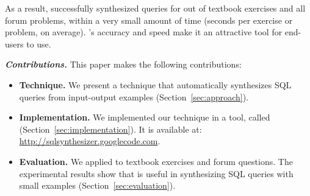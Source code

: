 As a result, \ourtool successfully synthesized queries
for \solexnum out of \exnum textbook exercises and
all \pnum forum problems, within a very
small amount of time (\avgsucctime seconds per exercise or problem, on average).
\ourtool's accuracy and speed make it an attractive
tool for end-users to use.%


\vspace{1mm}
\noindent\textbf{\textit{Contributions.}}
This paper makes the following contributions:

\begin{itemize}

\item \textbf{Technique.} We present a technique that automatically
synthesizes SQL queries from input-output examples
(Section~\ref{sec:approach}).

\item \textbf{Implementation.} We implemented our technique in a
tool, called \ourtool (Section~\ref{sec:implementation}). It is
available at: \url{http://sqlsynthesizer.googlecode.com}.

\item \textbf{Evaluation.} We applied \ourtool
to \exnum textbook exercises and \pnum 
forum questions.
The experimental results show that \ourtool is
useful in synthesizing SQL queries with
small examples (Section~\ref{sec:evaluation}).
\end{itemize}
